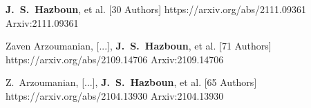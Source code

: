          {\textbf{J.~S.~{Hazboun}}, et al. [30 Authors]}
         {https://arxiv.org/abs/2111.09361}
         {{Arxiv:}2111.09361}

         {Zaven Arzoumanian, [...], \textbf{J.~S.~{Hazboun}}, et al. [71 Authors]}
         {https://arxiv.org/abs/2109.14706}
         {{Arxiv:}2109.14706}

         {Z.~{Arzoumanian}, [...], \textbf{J.~S.~{Hazboun}}, et al. [65 Authors]}
         {https://arxiv.org/abs/2104.13930}
         {{Arxiv:}2104.13930}

